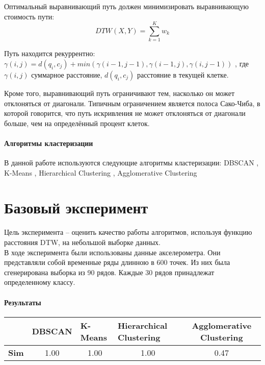 \documentclass[12pt,twoside]{article}
\begin{document}
        Оптимальный выравнивающий путь должен минимизировать выравнивающую стоимость пути:
            $$
                DTW(X, Y)=\displaystyle\sum\limits_{k=1}^{K} w_k
            $$
            
        Путь находится рекуррентно:\\
            $\gamma(i, j) = d(q_i, c_j) + min({\gamma(i-1, j-1), \gamma(i-1, j), \gamma(i, j-1)})$ ,
            где $\gamma(i, j)$ суммарное расстояние, $d(q_i, c_j)$ расстояние в текущей клетке.
                        
                Кроме того, выравнивающий путь ограничивают тем, насколько он может отклоняться от диагонали.
                Типичным ограничением является полоса Сако-Чиба, в которой говорится, что путь искривления не может отклоняться от диагонали больше,
                чем на определённый процент клеток.
        
    \paragraph{Алгоритмы кластеризации}
        В данной работе используются следующие алгоритмы кластеризации: DBSCAN \cite{tran2013revised}, K-Means \cite{petitjean2011global} \cite{hartigan1979algorithm}, Hierarchical Clustering \cite{mullner2013fastcluster}, Agglomerative Clustering \cite{mullner2013fastcluster} \\
    \section{Базовый эксперимент}
        Цель эксперимента – оценить качество работы алгоритмов, используя функцию расстояния DTW, на небольшой выборке данных. \\
        В ходе эксперимента были использованы данные акселерометра. Они представляли собой временные ряды длинною в 600 точек. Из них была сгенерирована выборка из 90 рядов. Каждые 30 рядов принадлежат определенному классу. 
        
        \paragraph{Результаты}
        \begin{table}[h!]
        \begin{tabular}{l|l|l|l|c|}
        \cline{2-5}
                                           & \textbf{DBSCAN}           & \textbf{K-Means}          & \textbf{Hierarchical Clustering} & \textbf{Agglomerative Clustering} \\ \hline
        \multicolumn{1}{|l|}{\textbf{Sim}} & \multicolumn{1}{c|}{1.00} & \multicolumn{1}{c|}{1.00} & \multicolumn{1}{c|}{1.00}        & 0.47                              \\ \hline
        \end{tabular}
        \end{table}   
                
        \printbibliography

    
\end{document}
